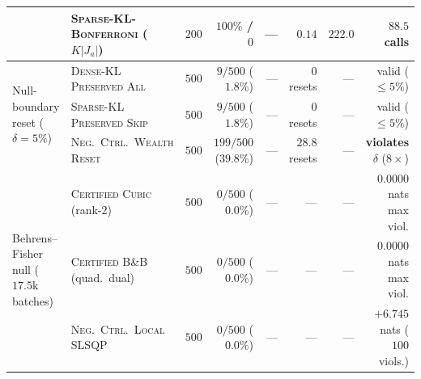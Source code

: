 \documentclass{article}
\theoremstyle{plain}
\theoremstyle{definition}
\begin{document}
\begin{table}[!htbp]
{\begin{tabular}{@{}llrrrrrr@{}}
 & \textsc{Sparse-KL-Bonferroni} ($K|J_a|$) & $200$ & $100\%$ / $0$ & --- & $0.14$ & $222.0$ & $88.5$ calls \\
\midrule
\multirow{3}{*}{Null-boundary reset ($\delta=5\%$)}
 & \textsc{Dense-KL Preserved All} & $500$ & $9/500$ ($\mathbf{1.8\%}$) & --- & $0$ resets & --- & valid ($\le 5\%$) \\
 & \textsc{Sparse-KL Preserved Skip} & $500$ & $9/500$ ($\mathbf{1.8\%}$) & --- & $0$ resets & --- & valid ($\le 5\%$) \\
 & \textsc{Neg.\ Ctrl.\ Wealth Reset} & $500$ & $199/500$ ($\mathbf{39.8\%}$) & --- & $28.8$ resets & --- & \textbf{violates $\delta$} ($8\times$) \\
\midrule
\multirow{3}{*}{Behrens--Fisher null ($17.5\mathrm{k}$ batches)}
 & \textsc{Certified Cubic} (rank-2) & $500$ & $0/500$ ($\mathbf{0.0\%}$) & --- & --- & --- & $\mathbf{0.0000}$ nats max viol. \\
 & \textsc{Certified B\&B} (quad.\ dual) & $500$ & $0/500$ ($\mathbf{0.0\%}$) & --- & --- & --- & $\mathbf{0.0000}$ nats max viol. \\
 & \textsc{Neg.\ Ctrl.\ Local SLSQP} & $500$ & $0/500$ ($0.0\%$) & --- & --- & --- & $\mathbf{+6.745}$ nats ($100$ viols.) \\
\bottomrule
\end{tabular}%
}
\end{table}
\end{document}
